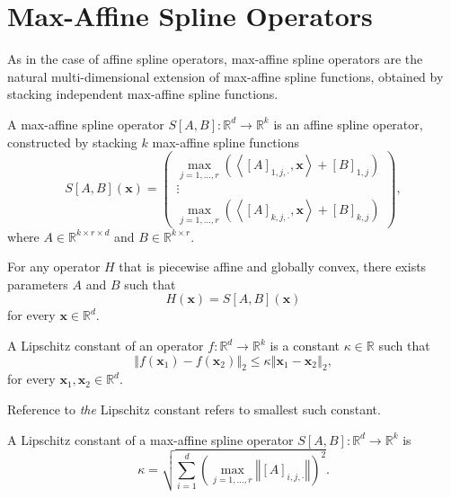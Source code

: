 \section{Max-Affine Spline Operators}

As in the case of affine spline operators, max-affine spline operators are the natural multi-dimensional extension of max-affine spline functions, obtained by stacking independent max-affine spline functions.

\begin{definition}
    A max-affine spline operator $S[A,B]:\mathbb{R}^d\to\mathbb{R}^k$ is an affine spline operator, constructed by stacking $k$ max-affine spline functions $$S[A,B](\mathbf{x})=\begin{pmatrix}\max_{j=1,\dots,r}\left(\left\langle[A]_{1,j,\cdot},\mathbf{x}\right\rangle+[B]_{1,j}\right)\\\vdots\\\max_{j=1,\dots,r}\left(\left\langle[A]_{k,j,\cdot},\mathbf{x}\right\rangle+[B]_{k,j}\right)\end{pmatrix},$$where $A\in\mathbb{R}^{k\times r\times d}$ and $B\in\mathbb{R}^{k\times r}$.
\end{definition}

\begin{proposition}
    For any operator $H$ that is piecewise affine and globally convex, there exists parameters $A$ and $B$ such that $$H(\mathbf{x})=S[A,B](\mathbf{x})$$for every $\mathbf{x}\in\mathbb{R}^d$.
\end{proposition}

\begin{definition}
    A Lipschitz constant of an operator $f:\mathbb{R}^d\to\mathbb{R}^k$ is a constant $\kappa\in\mathbb{R}$ such that $$\left\Vert f\left(\mathbf{x}_1\right)-f\left(\mathbf{x}_2\right)\right\Vert_2\leq\kappa\left\Vert\mathbf{x}_1-\mathbf{x}_2\right\Vert_2,$$for every $\mathbf{x}_1,\mathbf{x}_2\in\mathbb{R}^d$.
\end{definition}

Reference to \emph{the} Lipschitz constant refers to smallest such constant.

\begin{proposition}\label{prop:maso_lipschitz}
    A Lipschitz constant of a max-affine spline operator $S[A,B]:\mathbb{R}^d\to\mathbb{R}^k$ is $$\kappa=\sqrt{\sum_{i=1}^d\left(\max_{j=1,\dots,r}\left\Vert[A]_{i,j,\cdot}\right\Vert\right)^2}.$$
\end{proposition}

